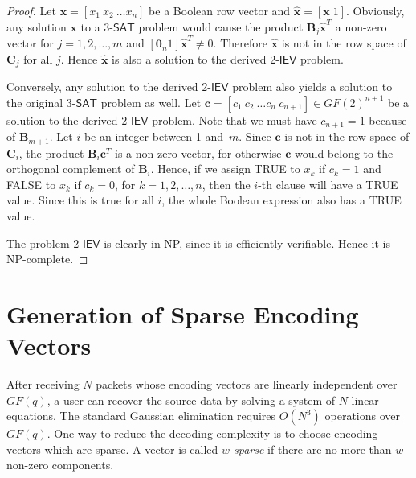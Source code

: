 \documentclass[letterpaper,conference,10pt]{IEEEtran}
\begin{document}
\begin{proof}
Let $\mathbf{x} = [x_1\ x_2\ \ldots x_n]$ be a Boolean row vector and $\hat{\mathbf{x}} = [\mathbf{x}\;1]$. Obviously, any solution $\mathbf{x}$ to a 3-$\mathsf{SAT}$ problem would cause the product $\mathbf{B}_j \hat {\mathbf{x}}^T$ a non-zero vector for $j=1, 2, \ldots, m$ and $[\mathbf{0}_n 1]\hat {\mathbf{x}}^T \neq 0$. Therefore $\hat{\mathbf{x}}$ is not in the row space of $\mathbf{C}_j$ for all $j$. Hence $\hat{\mathbf{x}}$ is also a solution to the derived 2-$\mathsf{IEV}$ problem.



Conversely, any solution to the derived 2-$\mathsf{IEV}$ problem also yields a solution to the original 3-$\mathsf{SAT}$  problem as well. Let $\mathbf{c} = [c_1\ c_2\ \ldots c_n\ c_{n+1}] \in GF(2)^{n+1}$ be a solution to the derived 2-$\mathsf{IEV}$ problem. Note that we must have $c_{n+1} = 1$ because of $\mathbf{B}_{m+1}$. Let  $i$ be an integer between 1 and~$m$. Since $\mathbf{c}$ is not in the row space of $\mathbf{C}_i$, the product $\mathbf{B}_i \mathbf{c}^T$ is a non-zero vector, for otherwise $\mathbf{c}$ would belong to the orthogonal complement of $\mathbf{B}_i$. Hence, if we assign TRUE to $x_k$ if $c_k=1$ and FALSE to $x_k$ if $c_k=0$, for $k=1,2,\ldots,n$, then the $i$-th clause will have a TRUE value. Since this is true for all $i$, the whole Boolean expression also has a TRUE value.

The problem 2-$\mathsf{IEV}$ is clearly in NP, since it is efficiently verifiable. Hence it is NP-complete.
\end{proof}




\section{Generation of Sparse Encoding Vectors} \label{sec:SEV}

After receiving $N$ packets whose encoding vectors are linearly independent over $GF(q)$, a user can recover the source data by solving a system of $N$ linear equations. The standard Gaussian elimination requires $O(N^3)$ operations over $GF(q)$. One way to reduce the decoding complexity is to choose encoding vectors which are sparse. A vector is called {\em $w$-sparse} if there are no more than $w$ non-zero components.
\end{document}

